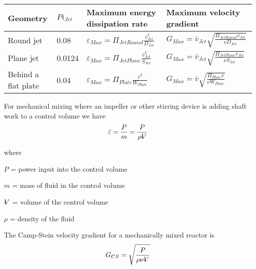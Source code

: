 \documentclass[letterpaper,10pt,english]{sphinxmanual}
\begin{document}
\begin{savenotes}\sphinxattablestart
\raggedright
{}
\label{\detokenize{Rapid_Mix/RM_Intro:id17}}\label{\detokenize{Rapid_Mix/RM_Intro:table-edr-g-equations}}
\sphinxaftercaption
\begin{tabulary}{\linewidth}[t]{|T|T|T|T|}
\hline
\sphinxstyletheadfamily 
Geometry
&
\(Pi_{Jet}\)
&\sphinxstyletheadfamily 
Maximum energy dissipation rate
&\sphinxstyletheadfamily 
Maximum velocity gradient
\\
\hline
Round jet
&
0.08
&
\(\varepsilon_{Max} = \Pi_{JetRound}\frac{   \bar v_{Jet} ^3}{D_{Jet}}\)
&
\(G_{Max} = \bar v_{Jet} \sqrt{\frac{\Pi_{JetRound} \bar v_{Jet} }{\nu D_{Jet}}}\)
\\
\hline
Plane jet
&
0.0124
&
\(\varepsilon_{Max} = \Pi_{JetPlane} \frac{  \bar v_{Jet} ^3}{S_{Jet}}\)
&
\(G_{Max} = \bar v_{Jet}\sqrt{\frac{\Pi_{JetPlane} \bar v_{Jet}}{\nu S_{Jet}}}\)
\\
\hline
Behind a flat plate
&
0.04
&
\(\varepsilon _{Max} = \Pi_{Plate}\frac{\bar v^3}{W_{Plate}}\)
&
\(G_{Max} = \bar v\sqrt{\frac{\Pi_{Plate} \bar v}{\nu W_{Plate}}}\)
\\
\hline
\end{tabulary}
\par
\sphinxattableend\end{savenotes}

For mechanical mixing where an impeller or other stirring device is adding shaft work to a control volume we have
\begin{equation}\label{equation:Rapid_Mix/RM_Intro:Rapid_Mix/RM_Intro:13}
\begin{split}\bar\varepsilon = \frac{P}{m} = \frac{P}{\rho \rlap{-}V}\end{split}
\end{equation}
\begin{DUlineblock}{0em}
\item[] where
\item[] \(P\) = power input into the control volume
\item[] \(m\) = mass of fluid in the control volume
\item[] \(\rlap{-}V\) = volume of the control volume
\item[] \(\rho\) = density of the fluid
\end{DUlineblock}

The Camp-Stein velocity gradient for a mechanically mixed reactor is
\begin{equation}\label{equation:Rapid_Mix/RM_Intro:Rapid_Mix/RM_Intro:14}
\begin{split}G_{CS} = \sqrt{\frac{P}{\rho \nu \rlap{-}V}}\end{split}
\end{equation}
\end{document}
